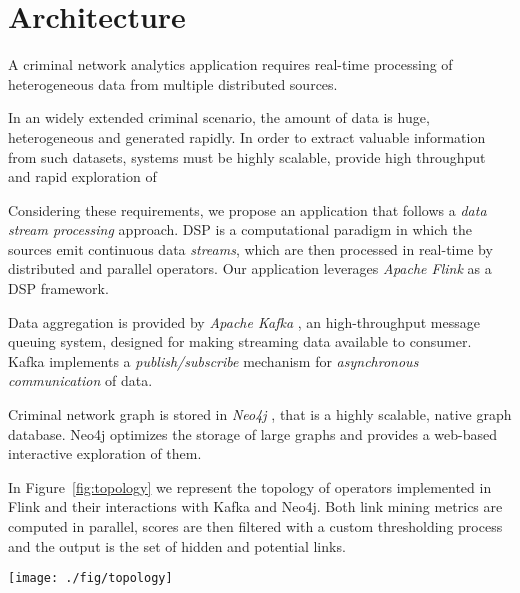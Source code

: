 \section{Architecture}
\label{sec:architecture}

A criminal network analytics application requires real-time processing of heterogeneous data from multiple distributed sources.

In an widely extended criminal scenario, the amount of data is  huge, heterogeneous and generated rapidly. In order to extract valuable information from such datasets, systems must be highly scalable, provide high throughput and rapid exploration of 

Considering these requirements, we propose an application that follows a \textit{data stream processing} approach. 
DSP is a computational paradigm in which the sources emit continuous data \textit{streams}, which are then processed in real-time by distributed and parallel operators.
Our application leverages \textit{Apache Flink} \cite{flink} as a DSP framework. 

Data aggregation is provided by \textit{Apache Kafka} \cite{kafka}, an high-throughput message queuing system, designed for making streaming data available to consumer. Kafka implements a \textit{publish/subscribe} mechanism for \textit{asynchronous communication} of data.

Criminal network graph is stored in \textit{Neo4j} \cite{neo4j}, that is a highly scalable, native graph database. Neo4j optimizes the storage of large graphs and provides a web-based interactive exploration of them.

In Figure~\ref{fig:topology} we represent the topology of operators implemented in Flink and their interactions with Kafka and Neo4j. Both link mining metrics are computed in parallel, scores are then filtered with a custom thresholding process and the output is the set of hidden and potential links.
 

\begin{figure*}
\centering
\texttt{[image: ./fig/topology]}
\caption{The topology of architecture.}
\label{fig:topology}
\end{figure*}
